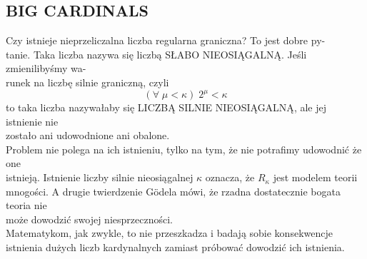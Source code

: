 \subsection{BIG CARDINALS}
{\large\color{acc}Czy istnieje nieprzeliczalna liczba regularna graniczna?} To jest dobre py-\\tanie. Taka liczba nazywa się liczbą {\large\color{def}SŁABO NIEOSIĄGALNĄ}. Jeśli zmienilibyśmy wa-\\runek na liczbę silnie graniczną, czyli
$$(\forall\;\mu<\kappa)\;2^\mu<\kappa$$
to taka liczba nazywałaby się {\large\color{def}LICZBĄ SILNIE NIEOSIĄGALNĄ}, ale jej istnienie nie \\zostało ani udowodnione ani obalone.\bigskip\\
Problem nie polega na ich istnieniu, tylko na tym, że nie potrafimy udowodnić że one \\istnieją. Istnienie liczby silnie nieosiągalnej $\kappa$ oznacza, że $R_\kappa$ jest modelem teorii \\mnogości. A drugie twierdzenie G{\"o}dela mówi, że rzadna dostatecznie bogata teoria nie \\może dowodzić swojej niesprzeczności. \medskip\\
Matematykom, jak zwykle, to nie przeszkadza i badają sobie konsekwencje istnienia dużych liczb kardynalnych zamiast próbować dowodzić ich istnienia.